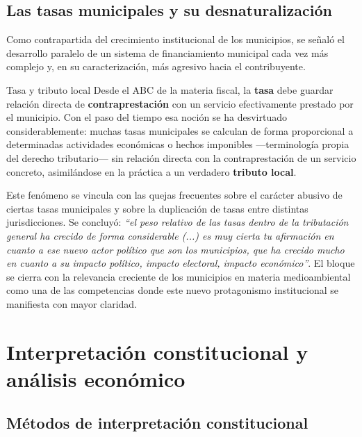 \documentclass[12pt,oneside]{book}
\begin{document}
\section{Las tasas municipales y su desnaturalización}

Como contrapartida del crecimiento institucional de los municipios, se señaló el desarrollo paralelo de un sistema de financiamiento municipal cada vez más complejo y, en su caracterización, más agresivo hacia el contribuyente.

\begin{definition}{Tasa y tributo local}
Desde el ABC de la materia fiscal, la \textbf{tasa} debe guardar relación directa de \textbf{contraprestación} con un servicio efectivamente prestado por el municipio. Con el paso del tiempo esa noción se ha desvirtuado considerablemente: muchas tasas municipales se calculan de forma proporcional a determinadas actividades económicas o hechos imponibles ---terminología propia del derecho tributario--- sin relación directa con la contraprestación de un servicio concreto, asimilándose en la práctica a un verdadero \textbf{tributo local}.
\end{definition}

Este fenómeno se vincula con las quejas frecuentes sobre el carácter abusivo de ciertas tasas municipales y sobre la duplicación de tasas entre distintas jurisdicciones. Se concluyó: \textit{``el peso relativo de las tasas dentro de la tributación general ha crecido de forma considerable (...) es muy cierta tu afirmación en cuanto a ese nuevo actor político que son los municipios, que ha crecido mucho en cuanto a su impacto político, impacto electoral, impacto económico''}. El bloque se cierra con la relevancia creciente de los municipios en materia medioambiental como una de las competencias donde este nuevo protagonismo institucional se manifiesta con mayor claridad.

\chapter[Interpretación y análisis económico]{Interpretación constitucional y análisis económico}

\section{Métodos de interpretación constitucional}
\end{document}
